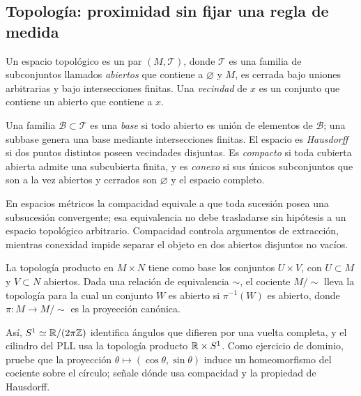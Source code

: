 \subsection{Topología: proximidad sin fijar una regla de medida}

\begin{definition}
Un espacio topológico es un par \((M,\mathcal T)\), donde \(\mathcal T\) es una
familia de subconjuntos llamados \emph{abiertos} que contiene a
\(\varnothing\) y \(M\), es cerrada bajo uniones arbitrarias y bajo
intersecciones finitas. Una \emph{vecindad} de \(x\) es un conjunto que
contiene un abierto que contiene a \(x\).
\end{definition}

\begin{definition}
Una familia \(\mathcal B\subset\mathcal T\) es una \emph{base} si todo abierto
es unión de elementos de \(\mathcal B\); una subbase genera una base mediante
intersecciones finitas. El espacio es \emph{Hausdorff} si dos puntos distintos
poseen vecindades disjuntas. Es \emph{compacto} si toda cubierta abierta admite
una subcubierta finita, y es \emph{conexo} si sus únicos subconjuntos que son a
la vez abiertos y cerrados son \(\varnothing\) y el espacio completo.
\end{definition}

En espacios métricos la compacidad equivale a que toda sucesión posea una
subsucesión convergente; esa equivalencia no debe trasladarse sin hipótesis a
un espacio topológico arbitrario. Compacidad controla argumentos de
extracción, mientras conexidad impide separar el objeto en dos abiertos
disjuntos no vacíos.

\begin{definition}
La topología producto en \(M\times N\) tiene como base los conjuntos
\(U\times V\), con \(U\subset M\) y \(V\subset N\) abiertos. Dada una relación
de equivalencia \(\sim\), el cociente \(M/{\sim}\) lleva la topología para la
cual un conjunto \(W\) es abierto si \(\pi^{-1}(W)\) es abierto, donde
\(\pi:M\to M/{\sim}\) es la proyección canónica.
\end{definition}

Así, \(S^1\simeq\mathbb{R}/(2\pi\mathbb Z)\) identifica ángulos que difieren por una
vuelta completa, y el cilindro del PLL usa la topología producto
\(\mathbb{R}\times S^1\).
\ifHAFOPedagogy
Como ejercicio de dominio, pruebe que la proyección
\(\theta\mapsto(\cos\theta,\sin\theta)\) induce un homeomorfismo del cociente
sobre el círculo; señale dónde usa compacidad y la propiedad de Hausdorff.
\fi

